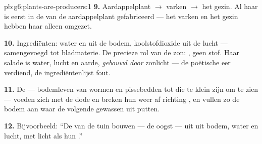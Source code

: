 \begin{solution}{pb:g6:plants-are-producers:1}
\textbf{9.} Aardappelplant $\rightarrow$ varken $\rightarrow$ het gezin.
Al haar  is eerst in de  van de aardappelplant
gefabriceerd --- het varken en het gezin hebben haar alleen omgezet.

\textbf{10.} Ingrediënten: water en  uit de bodem,
koolstofdioxide uit de lucht --- samengevoegd tot bladmaterie. De
precieze rol van de zon: , geen stof. Haar salade is water, lucht
en aarde, \emph{gebouwd door} zonlicht --- de poëtische eer verdiend, de
ingrediëntenlijst fout.

\textbf{11.} De  --- bodemleven van wormen en pissebedden tot
 die te klein zijn om te zien --- voeden zich met de dode
 en breken hun  weer af richting , en vullen zo de bodem aan waar de volgende gewassen uit putten.

\textbf{12.} Bijvoorbeeld: ``De  van de tuin bouwen
 --- de oogst --- uit  uit bodem, water
en lucht, met licht als hun .''
\end{solution}

